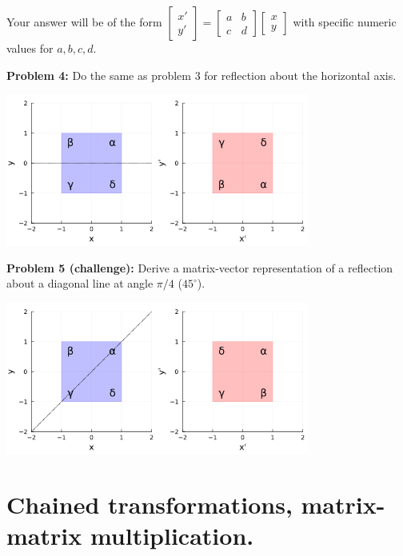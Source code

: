 \documentclass[letter]{article}
\begin{document}
Your answer will be of the form $
  \begin{bmatrix} x' \\ y' \end{bmatrix}
  =
  \begin{bmatrix} a & b \\ c & d \end{bmatrix}                       
  \begin{bmatrix} x \\ y \end{bmatrix}
$
with specific numeric values for $a,b,c,d$.

\newpage

{\bf Problem 4:} Do the same as problem 3 for reflection about the horizontal axis. 

\begin{center}
\includegraphics[width=0.75\textwidth]{yreflection.png}
\end{center}

\newpage

{\bf Problem 5 (challenge):} Derive a matrix-vector representation of a reflection
about a diagonal line at angle $\pi/4$ ($45^\circ$). 

\begin{center}
\includegraphics[width=0.75\textwidth]{diagonalreflection.png}
\end{center}
\newpage

\section{Chained transformations, matrix-matrix multiplication.}
\end{document}
